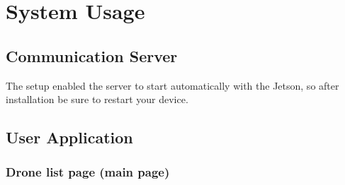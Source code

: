 \setcounter{tocdepth}{3}
\setcounter{secnumdepth}{3}

\chapter{System Usage}

\section{Communication Server}

The setup enabled the server to start automatically with the Jetson, so after installation be sure to restart your device.

\section{ User Application }
\subsection{Drone list page (main page)}

